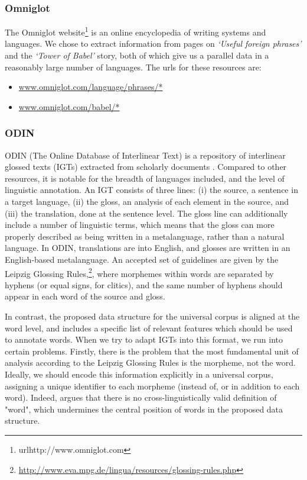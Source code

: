 \subsubsection{Omniglot}

The Omniglot website\footnote{url{http://www.omniglot.com}} is an online encyclopedia of writing systems and languages. We chose to extract information from pages on \emph{`Useful foreign phrases'} and the \emph{`Tower of Babel'} story, both of which give us a parallel data in a reasonably large number of languages. The urls for these resources are:

\begin{itemize}[noitemsep]
\item \url{www.omniglot.com/language/phrases/*} 
\item \url{www.omniglot.com/babel/*}
\end{itemize}

\subsubsection{ODIN} \label{sec:odin}

ODIN (The Online Database of Interlinear Text) is a repository of interlinear glossed texts (IGTs) extracted from scholarly documents \cite{lewis2006odin,lewis2010odin}.  Compared to other resources, it is notable for the breadth of languages included, and the level of linguistic annotation.  An IGT consists of three lines: (i) the source, a sentence in a target language, (ii) the gloss, an analysis of each element in the source, and (iii) the translation, done at the sentence level. The gloss line can additionally include a number of linguistic terms, which means that the gloss can more properly described as being written in a metalanguage, rather than a natural language.  In ODIN, translations are into English, and glosses are written in an English-based metalanguage.  An accepted set of guidelines are given by the Leipzig Glossing Rules,\footnote{\url{http://www.eva.mpg.de/lingua/resources/glossing-rules.php}}, where morphemes within words are separated by hyphens (or equal signs, for clitics), and the same number of hyphens should appear in each word of the source and gloss.

In contrast, the proposed data structure for the universal corpus is aligned at the word level, and includes a specific list of relevant features which should be used to annotate words. When we try to adapt IGTs into this format, we run into certain problems.  Firstly, there is the problem that the most fundamental unit of analysis according to the Leipzig Glossing Rules is the morpheme, not the word.  Ideally, we should encode this information explicitly in a universal corpus, assigning a unique identifier to each morpheme (instead of, or in addition to each word). Indeed,  argues that there is no cross-linguistically valid definition of "word", which undermines the central position of words in the proposed data structure.

